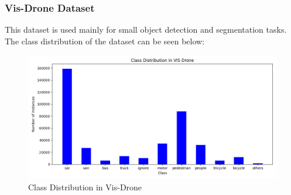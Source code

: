 \documentclass{beamer}
\begin{document}
\begin{frame}[t]
  \frametitle{Vis-Drone Dataset}
  This dataset is used mainly for small object detection and segmentation tasks. The class distribution of the dataset can be seen below:
  \begin{figure}[h!]
    \centering
    \includegraphics[scale=0.45]{Figures/vis_drone_data_class_distribution.png}
    \caption{Class Distribution in Vis-Drone}
    \label{fig:vis-class}
  \end{figure}
\end{frame}
\end{document}
